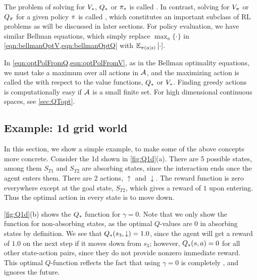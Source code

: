 The problem of solving for $V_{*}$, $Q_{*}$ or $\pi_{*}$
is called .
In contrast, solving for $V_{\pi}$ or $Q_{\pi}$ for a
given policy $\pi$ is called
,
which constitutes an important subclass of RL
problems as will be discussed in later sections.
For policy evaluation, we have similar Bellman equations,
which simply replace $\max_a\{\cdot\}$
in \cref{eqn:bellmanOptV,eqn:bellmanOptQ} with 
$\mathbb{E}_{{\pi(a|s)}}\left[ {\cdot} \right]$.


In \cref{eqn:optPolFromQ,eqn:optPolFromV}, as in the Bellman optimality equations, we must take a maximum over all actions in $\mathcal{A}$, and the maximizing action is called the  with respect to the value functions, $Q_{*}$ or $V_{*}$.
Finding greedy actions is computationally easy if $\mathcal{A}$ is a small finite set.
For high dimensional continuous spaces,  see \cref{sec:QTopt}.


\subsection{Example: 1d grid world}
\label{sec:Q1d}

In this section, we show a simple example,
to make some of the above concepts more concrete.
Consider the 1d 
shown in \cref{fig:Q1d}(a). There are 5 possible states,
among them $S_{T1}$ and $S_{T2}$ are absorbing states,
since the interaction ends once the agent enters them.
There are 2 actions, $\uparrow$ and $\downarrow$.
The reward function is zero everywhere except
at the goal state, $S_{T2}$,
which gives a reward of $1$ upon entering.
Thus the optimal action in every state is to move down.

\cref{fig:Q1d}(b) shows the $Q_{*}$ function for $\gamma=0$.
Note that we only show the function for non-absorbing states,
as the optimal $Q$-values are $0$ in absorbing states
by definition.
We see that $Q_{*}(s_3,\downarrow)=1.0$, since the agent will get a reward of $1.0$
on the next step if it moves down from $s_3$;
however, $Q_{*}(s,a)=0$ for all other state-action pairs,
since they do not provide nonzero immediate reward.
This optimal $Q$-function reflects the fact that
using $\gamma=0$ is completely ,
and ignores the future.

